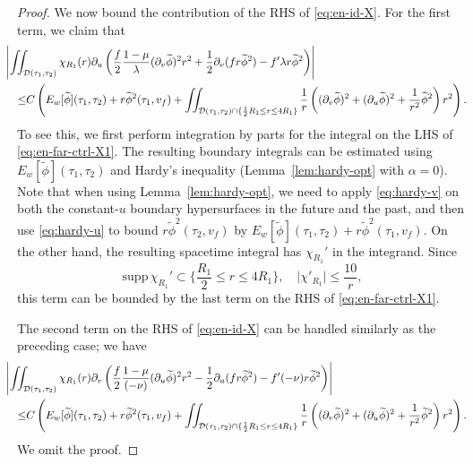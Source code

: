 \documentclass[10pt, reqno]{amsart}
\theoremstyle{definition}
\theoremstyle{remark}
\theoremstyle{conjecture}
\numberwithin{equation}{section}
\newcommand{\abs}[1]{\vert#1\vert}
\newcommand{\set}[1]{\{#1\}}
\newcommand{\rd}{\partial}
\newcommand{\0}{\emptyset}
\newcommand{\alp}{\alpha}
\newcommand{\lmb}{\lambda}
\newcommand{\calD}{\mathcal D}
\newcommand{\dur}{\nu}
\newcommand{\dvr}{\lmb}
\newcommand{\phibg}{\overline{\phi}}				%
\newcommand{\phidf}{\widetilde{\phi}}				%
\newcommand{\Abs}[1]{\left\vert #1 \right\vert}
\begin{document}
\begin{proof}
We now bound the contribution of the RHS of \eqref{eq:en-id-X}. For the first term, we claim that
\begin{equation} \label{eq:en-far-ctrl-X1}
\begin{aligned}
 & \hskip-2em
\Abs{\iint_{\calD(\tau_{1}, \tau_{2})} \chi_{R_{1}}(r) \rd_{u} \left( \frac{f}{2} \frac{1-\mu}{\dvr} (\rd_{v} \phidf)^{2} r^{2} + \frac{1}{2} \rd_{v}(f r \phidf^{2}) - f' \dvr r \phidf^{2} \right)} \\
\leq & C \left( E_{w}[\phidf](\tau_{1}, \tau_{2}) + r \phidf^{2}(\tau_{1}, v_{f})
		+ \iint_{\calD(\tau_{1}, \tau_{2}) \cap \set{\frac{1}{2} R_{1} \leq r \leq 4 R_{1}}} \frac{1}{r} \left( (\rd_{v} \phidf)^{2} + (\rd_{u} \phidf)^{2} + \frac{1}{r^{2}} \phidf^{2}\right) r^{2} \right).
\end{aligned}
\end{equation}
To see this, we first perform integration by parts for the integral on the LHS of \eqref{eq:en-far-ctrl-X1}. The resulting boundary integrals can be estimated using $E_{w}[\phidf](\tau_{1}, \tau_{2})$ and Hardy's inequality (Lemma~\ref{lem:hardy-opt} with $\alp = 0$). Note that when using Lemma~\ref{lem:hardy-opt}, we need to apply \eqref{eq:hardy-v} on both the constant-$u$ boundary hypersurfaces in the future and the past, and then use \eqref{eq:hardy-u} to bound $r \phidf^{2}(\tau_{2}, v_{f})$ by $E_{w}[\phidf](\tau_{1}, \tau_{2})+r \phidf^{2}(\tau_{1}, v_{f})$. On the other hand, the resulting spacetime integral has $\chi_{R_{1}}'$ in the integrand. Since
\begin{equation*}
	\mathrm{supp} \, \chi_{R_{1}}' \subset \set{\frac{R_{1}}{2} \leq r \leq 4 R_{1}}, \quad
	\abs{\chi'_{R_{1}}} \leq \frac{10}{r},
\end{equation*}
this term can be bounded by the last term on the RHS of \eqref{eq:en-far-ctrl-X1}.

The second term on the RHS of \eqref{eq:en-id-X} can be handled similarly as the preceding case; we have
\begin{equation} \label{eq:en-far-ctrl-X2}
\begin{aligned}
 & \hskip-2em
\Abs{\iint_{\calD(\tau_{1}, \tau_{2})} \chi_{R_{1}}(r) \rd_{v} \left( \frac{f}{2} \frac{1-\mu}{(-\dur)} (\rd_{u} \phidf)^{2} r^{2} - \frac{1}{2} \rd_{u}(f r \phidf^{2}) - f' (-\dur) r \phidf^{2} \right)} \\
\leq & C \left( E_{w}[\phidf](\tau_{1}, \tau_{2}) + r \phidf^{2}(\tau_{1}, v_{f})
		+ \iint_{\calD(\tau_{1}, \tau_{2}) \cap \set{\frac{1}{2} R_{1} \leq r \leq 4 R_{1}}} \frac{1}{r} \left( (\rd_{v} \phidf)^{2} + (\rd_{u} \phidf)^{2} + \frac{1}{r^{2}} \phidf^{2}\right) r^{2} \right).
\end{aligned}
\end{equation}
We omit the proof. 


\end{proof}
\end{document}
